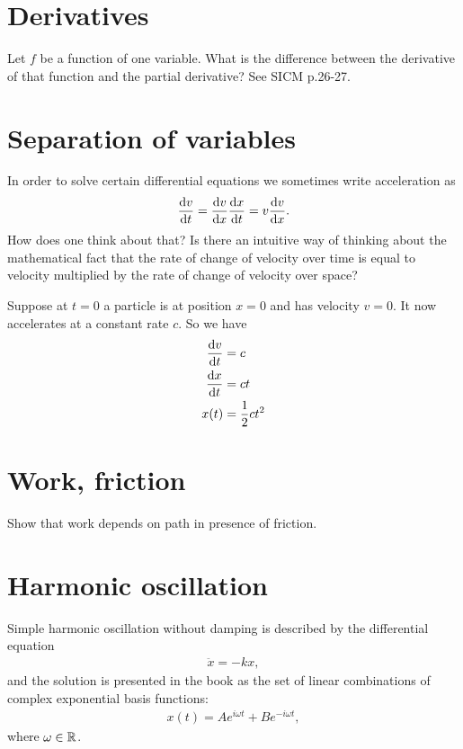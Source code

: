 \section{Derivatives}
Let $f$ be a function of one variable. What is the difference between the derivative of that function and the partial derivative? See SICM p.26-27.

\section{Separation of variables}
In order to solve certain differential equations we sometimes write acceleration as
\begin{align*}
  \frac{\d v}{\dt} = \frac{\d v}{\dx}\frac{\dx}{\dt} = v \frac{\d v}{\dx}.
\end{align*}
How does one think about that? Is there an intuitive way of thinking about the mathematical fact
that the rate of change of velocity over time is equal to velocity multiplied by the rate of change
of velocity over space?

\begin{mdframed}
  Suppose at $t=0$ a particle is at position $x=0$ and has velocity $v=0$. It now accelerates at a
  constant rate $c$. So we have
  \begin{align*}
    \dvdt &= c \\
    \dxdt &= ct \\
    x(t) &= \frac{1}{2}ct^2
  \end{align*}

\end{mdframed}

\section{Work, friction}
Show that work depends on path in presence of friction.

\section{Harmonic oscillation}

Simple harmonic oscillation without damping is described by the differential equation
\begin{align*}
  \ddot{x} = -kx,
\end{align*}
and the solution is presented in the book as the set of linear combinations of complex exponential
basis functions:
\begin{align*}
  x(t) = Ae^{i\omega t} + Be^{-i\omega t},
\end{align*}
where $\omega \in \mathbb{R}$.

